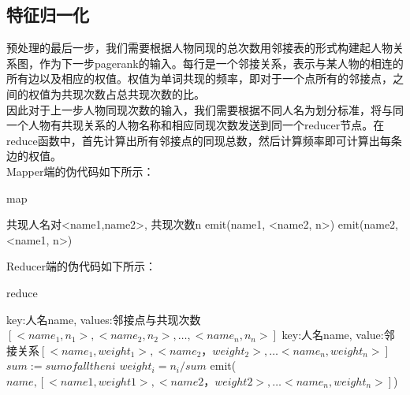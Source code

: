 \subsection{特征归一化}
预处理的最后一步，我们需要根据人物同现的总次数用邻接表的形式构建起人物关系图，作为下一步pagerank的输入。每行是一个邻接关系，表示与某人物的相连的所有边以及相应的权值。权值为单词共现的频率，即对于一个点所有的邻接点，之间的权值为共现次数占总共现次数的比。\\
\indent 因此对于上一步人物同现次数的输入，我们需要根据不同人名为划分标准，将与同一个人物有共现关系的人物名称和相应同现次数发送到同一个reducer节点。在reduce函数中，首先计算出所有邻接点的同现总数，然后计算频率即可计算出每条边的权值。\\
Mapper端的伪代码如下所示：
\begin{algorithm}[H]
	\caption{map}
	\begin{algorithmic}[1]
		\REQUIRE 共现人名对<name1,name2>, 共现次数n
		\STATE emit(name1, <name2, n>)
		\STATE emit(name2, <name1, n>)
	\end{algorithmic}
\end{algorithm}
Reducer端的伪代码如下所示：
\begin{algorithm}[H]
	\caption{reduce}
	\begin{algorithmic}[1]
		\REQUIRE key:人名name, values:邻接点与共现次数$[<name_1, n_1>, <name_2,n_2>,…,<name_n,n_n>]$
		\ENSURE key:人名name, value:邻接关系$[<name_1, weight_1>,<name_2，weight_2>,…<name_n,weight_n>]$
		\STATE $sum:=sum of all the ni$
		\STATE $weight_i=n_i/sum$
		\ENDFOR
		\STATE emit($name, [<name1, weight1>,<name2，weight2>,…<name_n, weight_n>]$)
	\end{algorithmic}
\end{algorithm}

